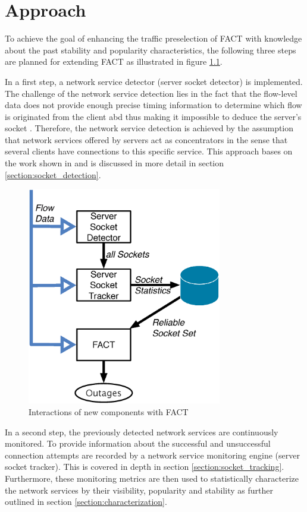 \chapter{Approach
\label{chapter:approach}}

To achieve the goal of enhancing the traffic preselection of \gls{FACT} with knowledge about the past stability and popularity characteristics, the following three steps are planned for extending \gls{FACT} as illustrated in figure  \ref{fig:FACT}.

In a first step, a network service detector (server socket detector) is  implemented. 
The challenge of the network service detection lies in the fact that the flow-level data does not provide enough precise timing information to determine which flow is originated from the client abd thus making it impossible to deduce the server's socket \citep{Schatzmann:Tracing}. 
Therefore, the network service detection is achieved by the assumption that network services offered by servers act as concentrators in the sense that several clients have connections to this specific service. 
This approach bases on the work shown in \cite{Schatzmann:Dissection, Schatzmann:Mining, Schatzmann:Tracing} and is discussed in more detail in section \ref{section:socket_detection}.

\begin{figure}
	[t] \centering
	\includegraphics[width=8.5cm]{images/Approach_blockdiagram.eps}
	\caption{Interactions of new components with \gls{FACT}} 
	\label{fig:FACT} 
\end{figure}

In a second step, the previously detected network services are continuously  monitored. To provide information about the successful and unsuccessful connection attempts are recorded by a network service monitoring engine (server socket tracker). This is covered in depth in section \ref{section:socket_tracking}.
Furthermore, these monitoring metrics are then used to statistically characterize the network services by their visibility, popularity and stability as further outlined in section \ref{section:characterization}.

